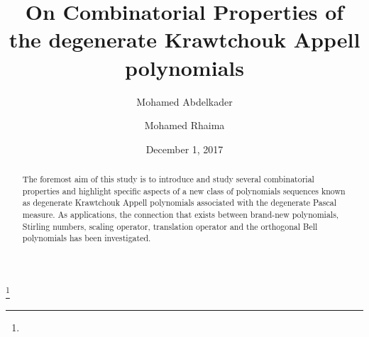 \documentclass{birkjour}
\theoremstyle{definition}
\theoremstyle{remark}
\numberwithin{equation}{section}
\begin{document}
%
\title[On Combinatorial Properties of the DKAP]
{On Combinatorial Properties of the degenerate Krawtchouk Appell
polynomials}
%
\author{Mohamed Abdelkader}
\address{%
Department of Statistics and Operations Research, College of
Science, King Saud University, P.O. Box 2455, Riyadh 11451, Saudi
Arabia} 
%
\author{Mohamed Rhaima}
\address{%
Department of Statistics and Operations Research, College of
Sciences, King Saud University, P.O. Box 2455, Riyadh 11451, Saudi
Arabia} 
\thanks{}
\date{December 1, 2017}
\dedicatory{}
\begin{abstract}
The foremost aim of this study is to introduce and study several
combinatorial properties and highlight specific aspects of a new
class of polynomials sequences known as degenerate Krawtchouk Appell
polynomials associated with the degenerate Pascal measure. As
applications, the connection that exists between brand-new
polynomials, Stirling numbers, scaling operator, translation
operator and the orthogonal Bell polynomials has been investigated.
\end{abstract}
\maketitle
\end{document}
